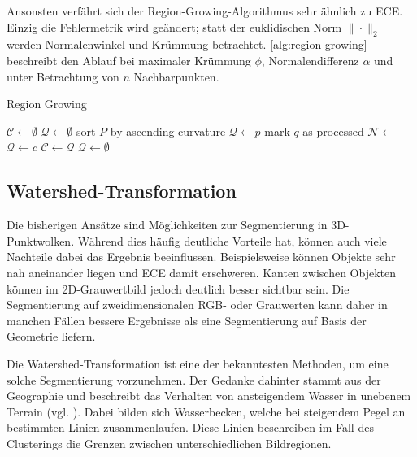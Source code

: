 Ansonsten verfährt sich der Region-Growing-Algorithmus sehr ähnlich zu \ac{ECE}.
Einzig die Fehlermetrik wird geändert; statt der euklidischen Norm $\|\cdot\|_2$ werden Normalenwinkel und Krümmung betrachtet.
\autoref{alg:region-growing} beschreibt den Ablauf bei maximaler Krümmung $\phi$, Normalendifferenz $\alpha$ und unter Betrachtung von $n$ Nachbarpunkten.

\begin{algorithm}
\caption{Region Growing}
\label{alg:region-growing}
\begin{algorithmic}
\State $\mathcal{C} \gets \emptyset$
\State $\mathcal{Q} \gets \emptyset$
\State sort $P$ by ascending curvature
	\State $\mathcal{Q} \gets p$
		\State mark $q$ as processed
		\State $\mathcal{N} \gets$ 
				\State $\mathcal{Q} \gets c$
			\EndIf
		\EndFor
	\EndFor
	\State $\mathcal{C} \gets \mathcal{Q}$
	\State $\mathcal{Q} \gets \emptyset$
\EndFor
\State {}
\end{algorithmic}
\end{algorithm}


\subsection{Watershed-Transformation}
\label{subsec:watershed}

Die bisherigen Ansätze sind Möglichkeiten zur Segmentierung in 3D-Punktwolken.
Während dies häufig deutliche Vorteile hat, können auch viele Nachteile dabei das Ergebnis beeinflussen.
Beispielsweise können Objekte sehr nah aneinander liegen und \ac{ECE} damit erschweren.
Kanten zwischen Objekten können im 2D-Grauwertbild jedoch deutlich besser sichtbar sein.
Die Segmentierung auf zweidimensionalen RGB- oder Grauwerten kann daher in manchen Fällen bessere Ergebnisse als eine Segmentierung auf Basis der Geometrie liefern.

Die Watershed-Transformation ist eine der bekanntesten Methoden, um eine solche Segmentierung vorzunehmen.
Der Gedanke dahinter stammt aus der Geographie und beschreibt das Verhalten von ansteigendem Wasser in unebenem Terrain (vgl. \cite[1--2]{roerdink2000watershed}).
Dabei bilden sich Wasserbecken, welche bei steigendem Pegel an bestimmten Linien zusammenlaufen.
Diese Linien beschreiben im Fall des Clusterings die Grenzen zwischen unterschiedlichen Bildregionen.

